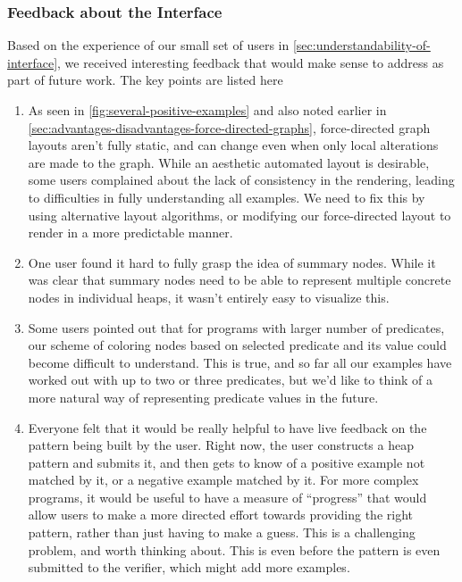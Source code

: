 \subsubsection{Feedback about the Interface}
Based on the experience of our small set of users in
\autoref{sec:understandability-of-interface}, we received interesting feedback that
would make sense to address as part of future work. The key points are listed here

\begin{enumerate}
  \item As seen in \autoref{fig:several-positive-examples} and also noted earlier in \autoref{sec:advantages-disadvantages-force-directed-graphs}, force-directed graph layouts aren't fully static, and can change even when only local alterations are made to the graph. While an aesthetic automated layout is desirable, some users complained about the lack of consistency in the rendering, leading to difficulties in fully understanding all examples. We need to fix this by using alternative layout algorithms, or modifying our force-directed layout to render in a more predictable manner.
  \item One user found it hard to fully grasp the idea of summary nodes. While it was clear that summary nodes need to be able to represent multiple concrete nodes in individual heaps, it wasn't entirely easy to visualize this.
  \item Some users pointed out that for programs with larger number of predicates, our scheme of coloring nodes based on selected predicate and its value could become difficult to understand. This is true, and so far all our examples have worked out with up to two or three predicates, but we'd like to think of a more natural way of representing predicate values in the future.
  \item Everyone felt that it would be really helpful to have live feedback on the pattern being built by the user. Right now, the user constructs a heap pattern and submits it, and then gets to know of a positive example not matched by it, or a negative example matched by it. For more complex programs, it would be useful to have a measure of ``progress'' that would allow users to make a more directed effort towards providing the right pattern, rather than just having to make a guess. This is a challenging problem, and worth thinking about. This is even before the pattern is even submitted to the verifier, which might add more examples.
\end{enumerate}

